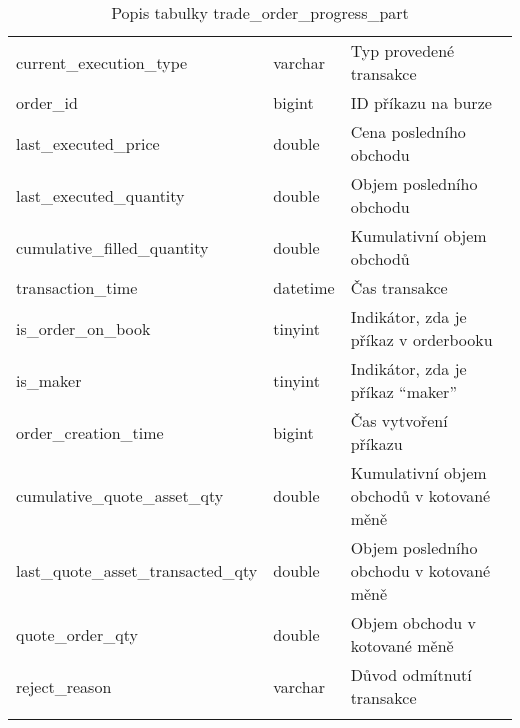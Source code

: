 \begin{center}
\begin{longtable}[t]{|l|C{4cm}|p{4cm}|}
        current\_execution\_type            & varchar          & Typ provedené transakce                     \\
        order\_id                           & bigint           & ID příkazu na burze                                            \\
        last\_executed\_price               & double           & Cena posledního obchodu                                             \\
        last\_executed\_quantity            & double           & Objem posledního obchodu                                             \\
        cumulative\_filled\_quantity        & double           & Kumulativní objem obchodů                                             \\
        transaction\_time                   & datetime         & Čas transakce                                             \\
        is\_order\_on\_book                 & tinyint          & Indikátor, zda je příkaz v orderbooku                                             \\
        is\_maker                           & tinyint          & Indikátor, zda je příkaz \enquote{maker}                                              \\
        order\_creation\_time               & bigint           & Čas vytvoření příkazu                                             \\
        cumulative\_quote\_asset\_qty       & double           & Kumulativní objem obchodů v kotované měně                                            \\
        last\_quote\_asset\_transacted\_qty & double           & Objem posledního obchodu v kotované měně                      \\
        quote\_order\_qty                   & double           & Objem obchodu v kotované měně                                             \\
        reject\_reason                      & varchar          & Důvod odmítnutí transakce                                             \\
        \hline
        \caption*{Popis tabulky trade\_order\_progress\_part}
        \label{tab:tradeOrderProgressPart}
    \end{longtable}
\end{center}
\endinput